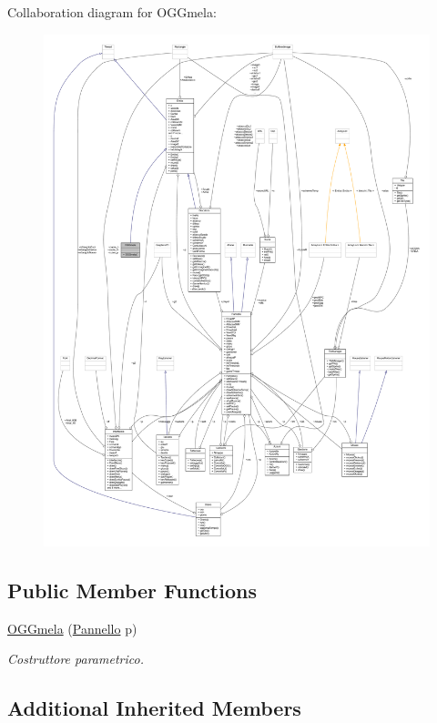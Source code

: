 Collaboration diagram for O\+G\+Gmela\+:
\nopagebreak
\begin{figure}[H]
\begin{center}
\leavevmode
\includegraphics[width=350pt]{classoggetti_1_1_o_g_gmela__coll__graph}
\end{center}
\end{figure}
\subsection*{Public Member Functions}
\begin{DoxyCompactItemize}
\item 
\hyperlink{classoggetti_1_1_o_g_gmela_a3f758bed86524b65271eb844b67680be}{O\+G\+Gmela} (\hyperlink{classa_1_1survival_1_1game_1_1_pannello}{Pannello} p)
\begin{DoxyCompactList}\small\item\em Costruttore parametrico. \end{DoxyCompactList}\end{DoxyCompactItemize}
\subsection*{Additional Inherited Members}


